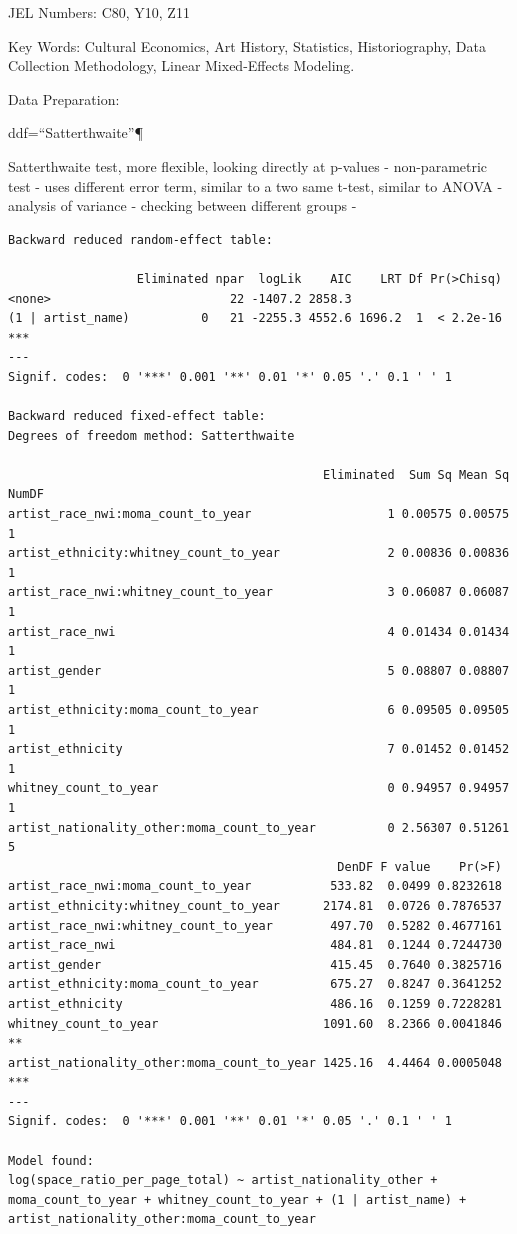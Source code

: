 \documentclass[
  letterpaper,
  DIV=11,
  numbers=noendperiod]{scrreprt}
\begin{document}
JEL Numbers: C80, Y10, Z11

Key Words: Cultural Economics, Art History, Statistics, Historiography,
Data Collection Methodology, Linear Mixed-Effects Modeling.

Data Preparation:

ddf=``Satterthwaite''¶

Satterthwaite test, more flexible, looking directly at p-values -
non-parametric test - uses different error term, similar to a two same
t-test, similar to ANOVA - analysis of variance - checking between
different groups -

\begin{verbatim}
Backward reduced random-effect table:

                  Eliminated npar  logLik    AIC    LRT Df Pr(>Chisq)    
<none>                         22 -1407.2 2858.3                         
(1 | artist_name)          0   21 -2255.3 4552.6 1696.2  1  < 2.2e-16 ***
---
Signif. codes:  0 '***' 0.001 '**' 0.01 '*' 0.05 '.' 0.1 ' ' 1

Backward reduced fixed-effect table:
Degrees of freedom method: Satterthwaite 

                                            Eliminated  Sum Sq Mean Sq NumDF
artist_race_nwi:moma_count_to_year                   1 0.00575 0.00575     1
artist_ethnicity:whitney_count_to_year               2 0.00836 0.00836     1
artist_race_nwi:whitney_count_to_year                3 0.06087 0.06087     1
artist_race_nwi                                      4 0.01434 0.01434     1
artist_gender                                        5 0.08807 0.08807     1
artist_ethnicity:moma_count_to_year                  6 0.09505 0.09505     1
artist_ethnicity                                     7 0.01452 0.01452     1
whitney_count_to_year                                0 0.94957 0.94957     1
artist_nationality_other:moma_count_to_year          0 2.56307 0.51261     5
                                              DenDF F value    Pr(>F)    
artist_race_nwi:moma_count_to_year           533.82  0.0499 0.8232618    
artist_ethnicity:whitney_count_to_year      2174.81  0.0726 0.7876537    
artist_race_nwi:whitney_count_to_year        497.70  0.5282 0.4677161    
artist_race_nwi                              484.81  0.1244 0.7244730    
artist_gender                                415.45  0.7640 0.3825716    
artist_ethnicity:moma_count_to_year          675.27  0.8247 0.3641252    
artist_ethnicity                             486.16  0.1259 0.7228281    
whitney_count_to_year                       1091.60  8.2366 0.0041846 ** 
artist_nationality_other:moma_count_to_year 1425.16  4.4464 0.0005048 ***
---
Signif. codes:  0 '***' 0.001 '**' 0.01 '*' 0.05 '.' 0.1 ' ' 1

Model found:
log(space_ratio_per_page_total) ~ artist_nationality_other + moma_count_to_year + whitney_count_to_year + (1 | artist_name) + artist_nationality_other:moma_count_to_year
\end{verbatim}
\end{document}
